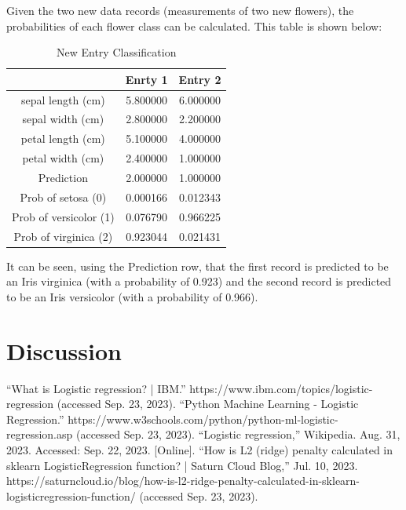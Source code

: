 \documentclass[journal]{IEEEtran}
\begin{document}
Given the two new data records (measurements of two new flowers), the probabilities of each flower class can be calculated. This table is shown below: 
    
\begin{table}[h!]
\centering
\begin{tabular}{ c | c c }
 & Enrty 1 &	Entry 2 \\ 
\hline
sepal length (cm)	& 5.800000	& 6.000000 \\
sepal width (cm)	& 2.800000	& 2.200000 \\
petal length (cm)	& 5.100000	& 4.000000 \\
petal width (cm)	& 2.400000	& 1.000000 \\
Prediction	& 2.000000	& 1.000000 \\
Prob of setosa (0)	& 0.000166	& 0.012343 \\
Prob of versicolor (1)	& 0.076790	& 0.966225 \\
Prob of virginica (2)	& 0.923044	& 0.021431
\end{tabular}
\caption{New Entry Classification}
\label{table:new-entry-table}
\end{table}

It can be seen, using the Prediction row, that the first record is predicted to be an Iris virginica (with a probability of 0.923) and the second record is predicted to be an Iris versicolor (with a probability of 0.966).

\section{Discussion}



\begin{thebibliography}{00}
“What is Logistic regression? | IBM.” https://www.ibm.com/topics/logistic-regression (accessed Sep. 23, 2023).
“Python Machine Learning - Logistic Regression.” https://www.w3schools.com/python/python-ml-logistic-regression.asp (accessed Sep. 23, 2023).
“Logistic regression,” Wikipedia. Aug. 31, 2023. Accessed: Sep. 22, 2023. [Online].
“How is L2 (ridge) penalty calculated in sklearn LogisticRegression function? | Saturn Cloud Blog,” Jul. 10, 2023. https://saturncloud.io/blog/how-is-l2-ridge-penalty-calculated-in-sklearn-logisticregression-function/ (accessed Sep. 23, 2023).

\end{thebibliography}
\end{document}
